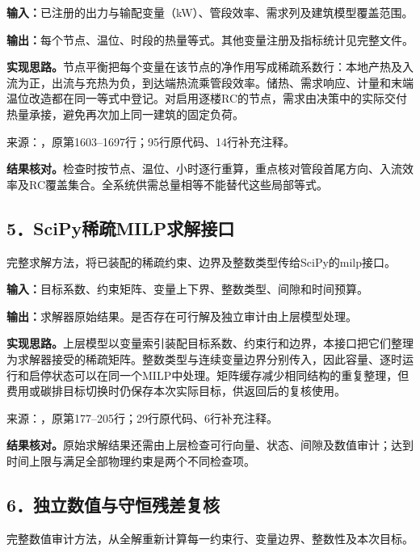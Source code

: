 \noindent\textbf{输入：}已注册的出力与输配变量（kW）、管段效率、需求列及建筑模型覆盖范围。\par
\noindent\textbf{输出：}每个节点、温位、时段的热量等式。其他变量注册及指标统计见完整文件。\par

\noindent\textbf{实现思路。}节点平衡把每个变量在该节点的净作用写成稀疏系数行：本地产热及入流为正，出流与充热为负，到达端热流乘管段效率。储热、需求响应、计量和末端温位改造都在同一等式中登记。对启用逐楼RC的节点，需求由决策中的实际交付热量承接，避免再次加上同一建筑的固定负荷。

{\small 来源：，原第1603--1697行；95行原代码、14行补充注释。}\par

\begingroup
{}

\endgroup

\noindent\textbf{结果核对。}检查时按节点、温位、小时逐行重算，重点核对管段首尾方向、入流效率及RC覆盖集合。全系统供需总量相等不能替代这些局部等式。

\subsection*{5．SciPy稀疏MILP求解接口}
完整求解方法，将已装配的稀疏约束、边界及整数类型传给SciPy的milp接口。

\noindent\textbf{输入：}目标系数、约束矩阵、变量上下界、整数类型、间隙和时间预算。\par
\noindent\textbf{输出：}求解器原始结果。是否存在可行解及独立审计由上层模型处理。\par

\noindent\textbf{实现思路。}上层模型以变量索引装配目标系数、约束行和边界，本接口把它们整理为求解器接受的稀疏矩阵。整数类型与连续变量边界分别传入，因此容量、逐时运行和启停状态可以在同一个MILP中处理。矩阵缓存减少相同结构的重复整理，但费用或碳排目标切换时仍保存本次实际目标，供返回后的复核使用。

{\small 来源：，原第177--205行；29行原代码、6行补充注释。}\par

\begingroup
{}

\endgroup

\noindent\textbf{结果核对。}原始求解结果还需由上层检查可行向量、状态、间隙及数值审计；达到时间上限与满足全部物理约束是两个不同检查项。

\subsection*{6．独立数值与守恒残差复核}
完整数值审计方法，从全解重新计算每一约束行、变量边界、整数性及本次目标。

